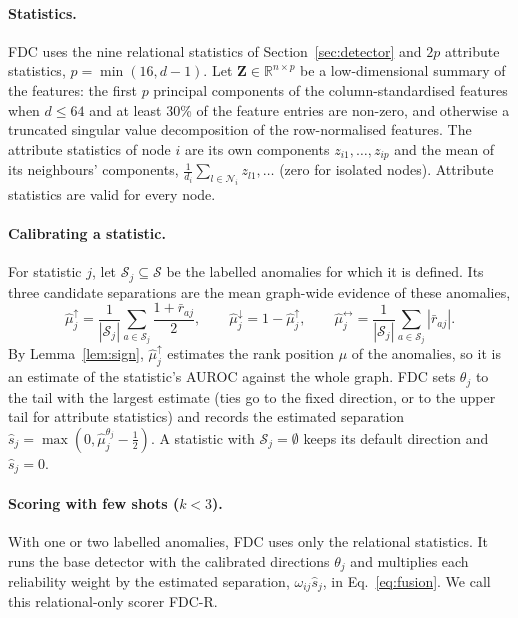 \documentclass[pdflatex,sn-mathphys-ay]{sn-jnl}
\theoremstyle{plain}
\theoremstyle{remark}
\begin{document}
\paragraph{Statistics.} FDC uses the nine relational statistics of Section~\ref{sec:detector} and $2p$ attribute statistics, $p=\min(16,d-1)$. Let $\mathbf{Z}\in\mathbb{R}^{n\times p}$ be a low-dimensional summary of the features: the first $p$ principal components of the column-standardised features when $d\le64$ and at least 30\% of the feature entries are non-zero, and otherwise a truncated singular value decomposition of the row-normalised features. The attribute statistics of node $i$ are its own components $z_{i1},\dots,z_{ip}$ and the mean of its neighbours' components, $\frac{1}{d_i}\sum_{l\in\mathcal{N}_i}z_{l1},\dots$ (zero for isolated nodes). Attribute statistics are valid for every node.

\paragraph{Calibrating a statistic.} For statistic $j$, let $\mathcal{S}_j\subseteq\mathcal{S}$ be the labelled anomalies for which it is defined. Its three candidate separations are the mean graph-wide evidence of these anomalies,
\begin{equation}\label{eq:sep}
\hat\mu^{\uparrow}_j=\frac{1}{|\mathcal{S}_j|}\sum_{a\in\mathcal{S}_j}\frac{1+\bar r_{aj}}{2},\qquad
\hat\mu^{\downarrow}_j=1-\hat\mu^{\uparrow}_j,\qquad
\hat\mu^{\leftrightarrow}_j=\frac{1}{|\mathcal{S}_j|}\sum_{a\in\mathcal{S}_j}|\bar r_{aj}|.
\end{equation}
By Lemma~\ref{lem:sign}, $\hat\mu^{\uparrow}_j$ estimates the rank position $\mu$ of the anomalies, so it is an estimate of the statistic's AUROC against the whole graph. FDC sets $\theta_j$ to the tail with the largest estimate (ties go to the fixed direction, or to the upper tail for attribute statistics) and records the estimated separation $\hat s_j=\max(0,\hat\mu^{\theta_j}_j-\tfrac12)$. A statistic with $\mathcal{S}_j=\emptyset$ keeps its default direction and $\hat s_j=0$.

\paragraph{Scoring with few shots ($k<3$).} With one or two labelled anomalies, FDC uses only the relational statistics. It runs the base detector with the calibrated directions $\theta_j$ and multiplies each reliability weight by the estimated separation, $\omega_{ij}\hat s_j$, in Eq.~\eqref{eq:fusion}. We call this relational-only scorer FDC-R.
\end{document}
